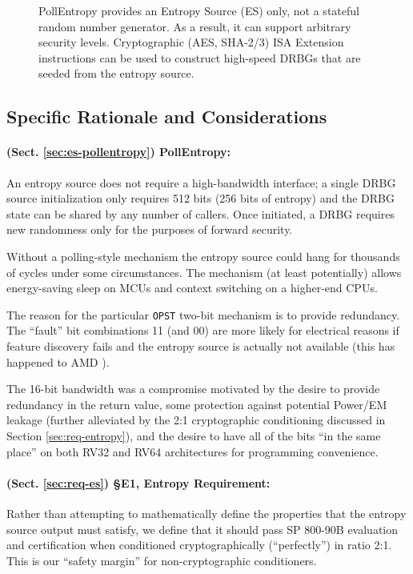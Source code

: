 \begin{figure}[tb]
    \centering
    
    \caption{PollEntropy provides an Entropy Source (ES) only, not a stateful
        random number generator. As a result, it can support arbitrary
        security levels. Cryptographic (AES, SHA-2/3) ISA Extension
        instructions can be used to construct high-speed DRBGs that are
        seeded from the entropy source.}
    \label{fig:rng_tikz}
\end{figure}

\subsection{Specific Rationale and Considerations}

    \paragraph{(Sect. \ref{sec:es-pollentropy}) PollEntropy:}
    An entropy source does not require a high-bandwidth interface;
    a single DRBG source initialization only requires 512 bits
    (256 bits of entropy) and the DRBG state can be shared by any number of
    callers. Once initiated, a DRBG requires new randomness only for the
    purposes of forward security.

    Without a polling-style mechanism the entropy source could hang for
    thousands of cycles under some circumstances. The  mechanism
    (at least potentially) allows energy-saving sleep on MCUs and context
    switching on a higher-end CPUs.

    The reason for the particular \verb|OPST| two-bit mechanism is to
    provide redundancy. The ``fault'' bit combinations 11 (and 00) are more
    likely for electrical reasons if feature discovery fails and the entropy
    source is actually not available (this has happened to AMD \cite{Sa19}).

    The 16-bit bandwidth was a compromise motivated by the desire to
    provide redundancy in the return value, some protection against
    potential Power/EM leakage (further alleviated by the 2:1 cryptographic
    conditioning discussed in Section \ref{sec:req-entropy}), and the desire
    to have all of the bits ``in the same place'' on both RV32 and RV64
    architectures for programming convenience.

    \paragraph{(Sect. \ref{sec:req-es}) \S E1, Entropy Requirement:}
    Rather than attempting to mathematically define the properties that the
    entropy source output must satisfy, we define that it should
    pass SP 800-90B evaluation and certification when conditioned
    cryptographically (``perfectly'') in ratio 2:1. This is our ``safety
    margin'' for non-cryptographic conditioners.

